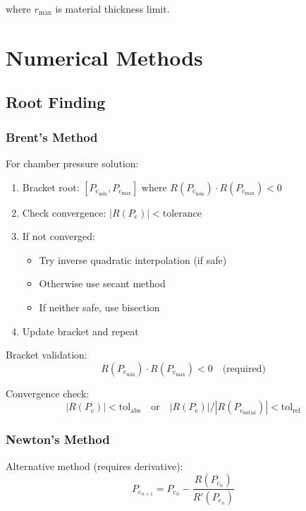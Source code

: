 \documentclass[12pt,a4paper]{article}
\newcommand{\Pc}{P_{\text{c}}}
\begin{document}
where $r_{\max}$ is material thickness limit.

\section{Numerical Methods}

\subsection{Root Finding}

\subsubsection{Brent's Method}

For chamber pressure solution:
\begin{enumerate}
    \item Bracket root: $[\Pc_{\min}, \Pc_{\max}]$ where $R(\Pc_{\min}) \cdot R(\Pc_{\max}) < 0$
    \item Check convergence: $|R(\Pc)| < \text{tolerance}$
    \item If not converged:
    \begin{itemize}
        \item Try inverse quadratic interpolation (if safe)
        \item Otherwise use secant method
        \item If neither safe, use bisection
    \end{itemize}
    \item Update bracket and repeat
\end{enumerate}

Bracket validation:
\begin{equation}
R(\Pc_{\min}) \cdot R(\Pc_{\max}) < 0 \quad \text{(required)}
\end{equation}

Convergence check:
\begin{equation}
|R(\Pc)| < \text{tol}_{\text{abs}} \quad \text{or} \quad |R(\Pc)| / |R(\Pc_{\text{initial}})| < \text{tol}_{\text{rel}}
\end{equation}

\subsubsection{Newton's Method}

Alternative method (requires derivative):
\begin{equation}
\Pc_{n+1} = \Pc_n - \frac{R(\Pc_n)}{R'(\Pc_n)}
\end{equation}
\end{document}
